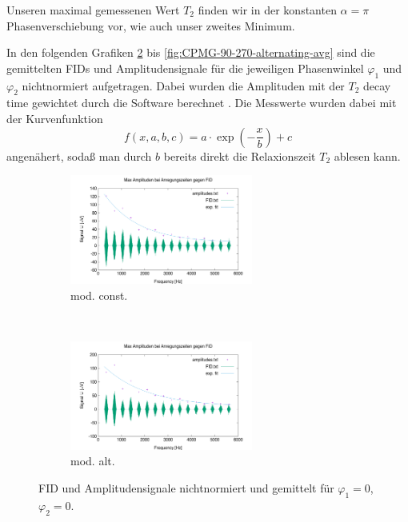 \documentclass{article}
\begin{document}
            Unseren maximal gemessenen Wert $T_2$ finden wir in der konstanten $\alpha = \pi$ Phasenverschiebung vor, wie auch unser zweites Minimum.

            In den folgenden Grafiken \ref{fig:CPMG-0-0-alternating-avg} bis \ref{fig:CPMG-90-270-alternating-avg} sind die gemittelten FIDs und Amplitudensignale für die jeweiligen Phasenwinkel $\varphi_1$ und $\varphi_2$ nichtnormiert aufgetragen. Dabei wurden die Amplituden mit der $T_2$ decay time gewichtet durch die Software berechnet \cite[ch 5.3.1]{doc:EFNMRStudentManual}. Die Messwerte wurden dabei mit der Kurvenfunktion 
            \[
                f(x,a,b,c) = a\cdot \exp(-\frac{x}{b}) + c
            \]
            angenähert, sodaß man durch $b$ bereits direkt die Relaxionszeit $T_2$ ablesen kann. 
        \begin{figure}[H]
            \centering
            \begin{subfigure}[b]{0.4\textwidth}
                \centering
                \includegraphics[width=6cm]{../Bilddateien/10/CPMG-0-0-constant-avg.png}
                \caption{mod. const.}
                \label{fig:CPMG-0-0-constant-avg}
            \end{subfigure}
            \
            \begin{subfigure}[b]{0.4\textwidth}
                \centering
                \includegraphics[width=6cm]{../Bilddateien/10/CPMG-0-0-alternating-avg.png}
                \caption{mod. alt.}
                \label{fig:CPMG-0-0-alternating-avg}
            \end{subfigure}
            \caption{FID und Amplitudensignale nichtnormiert und gemittelt für $\varphi_1 = 0$, $\varphi_2 = 0$.}
            \label{fig:CPMG-0-0-avg}
        \end{figure}
\end{document}
